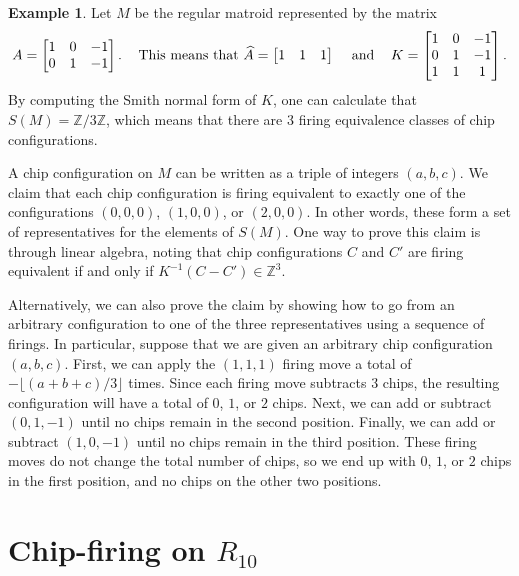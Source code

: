 \documentclass[12p]{amsart}
\numberwithin{equation}{section}
\theoremstyle{plain}
\theoremstyle{definition}
\newtheorem{example}[thm]{Example}
\newcommand{\Z}{\mathbb {Z}}
\begin{document}
\begin{example}
    Let $M$ be the regular matroid represented by the matrix 
    \[A = \begin{bmatrix} 1 & 0 & -1 \\ 0 & 1 & -1\end{bmatrix}.\hspace{ .3 cm} \text{ This means that } \widehat A = \begin{bmatrix} 1 & 1 & 1\end{bmatrix}\hspace{ .3 cm} \text{ and } \hspace{ .3 cm} K = \begin{bmatrix} 1 & 0 & -1 \\ 0 & 1 & -1 \\ 1 & 1 & 1\end{bmatrix}.\]
    By computing the Smith normal form of $K$, one can calculate that $S(M) = \Z/3\Z$, which means that there are 3 firing equivalence classes of chip configurations. 
    
    A chip configuration on $M$ can be written as a triple of integers $(a,b,c)$. We claim that each chip configuration is firing equivalent to exactly one of the configurations $(0,0,0)$, $(1,0,0)$, or $(2,0,0)$. In other words, these form a set of representatives for the elements of $S(M)$. One way to prove this claim is through linear algebra, noting that chip configurations $C$ and $C'$ are firing equivalent if and only if $K^{-1}(C-C') \in \Z^3$. 

    Alternatively, we can also prove the claim by showing how to go from an arbitrary configuration to one of the three representatives using a sequence of firings. In particular, suppose that we are given an arbitrary chip configuration $(a,b,c)$. First, we can apply the $(1,1,1)$ firing move a total of $-\lfloor(a+b+c)/3\rfloor$ times. Since each firing move subtracts 3 chips, the resulting configuration will have a total of $0$, $1$, or $2$ chips. Next, we can add or subtract $(0,1,-1)$ until no chips remain in the second position. Finally, we can add or subtract $(1,0,-1)$ until no chips remain in the third position. These firing moves do not change the total number of chips, so we end up with $0$, $1$, or $2$ chips in the first position, and no chips on the other two positions. 
\end{example}

\section{Chip-firing on $R_{10}$}\label{sec:R10} 
\end{document}
